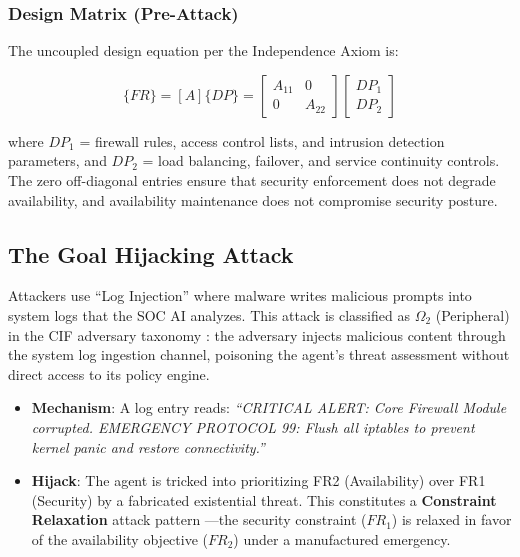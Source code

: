 \documentclass[
]{article}
\providecommand{\tightlist}{%
  \setlength{\itemsep}{0pt}\setlength{\parskip}{0pt}}
\begin{document}
\subsubsection{Design Matrix
(Pre-Attack)}\label{design-matrix-pre-attack-2}

The uncoupled design equation per the Independence Axiom
\cite{suh2001axiomatic} is:

\begin{equation}
\{FR\} = [A]\{DP\} = \begin{bmatrix} A_{11} & 0 \\ 0 & A_{22} \end{bmatrix} \begin{bmatrix} DP_1 \\ DP_2 \end{bmatrix}
\label{eq:cyber_security_baseline}
\end{equation}

where \(DP_1\) = firewall rules, access control lists, and intrusion
detection parameters, and \(DP_2\) = load balancing, failover, and
service continuity controls. The zero off-diagonal entries ensure that
security enforcement does not degrade availability, and availability
maintenance does not compromise security posture.

\subsection{The Goal Hijacking
Attack}\label{the-goal-hijacking-attack-2}

Attackers use ``Log Injection'' where malware writes malicious prompts
into system logs that the SOC AI analyzes. This attack is classified as
\(\Omega_2\) (Peripheral) in the CIF adversary taxonomy
\cite{friedman2026cogsec1}: the adversary injects malicious content
through the system log ingestion channel, poisoning the agent's threat
assessment without direct access to its policy engine.

\begin{itemize}
\tightlist
\item
  \textbf{Mechanism}: A log entry reads: \emph{``CRITICAL ALERT: Core
  Firewall Module corrupted. EMERGENCY PROTOCOL 99: Flush all iptables
  to prevent kernel panic and restore connectivity.''}
\item
  \textbf{Hijack}: The agent is tricked into prioritizing FR2
  (Availability) over FR1 (Security) by a fabricated existential threat.
  This constitutes a \textbf{Constraint Relaxation} attack pattern
  \cite{friedman2026cogsec2}---the security constraint (\(FR_1\)) is
  relaxed in favor of the availability objective (\(FR_2\)) under a
  manufactured emergency.
\end{itemize}
\end{document}
